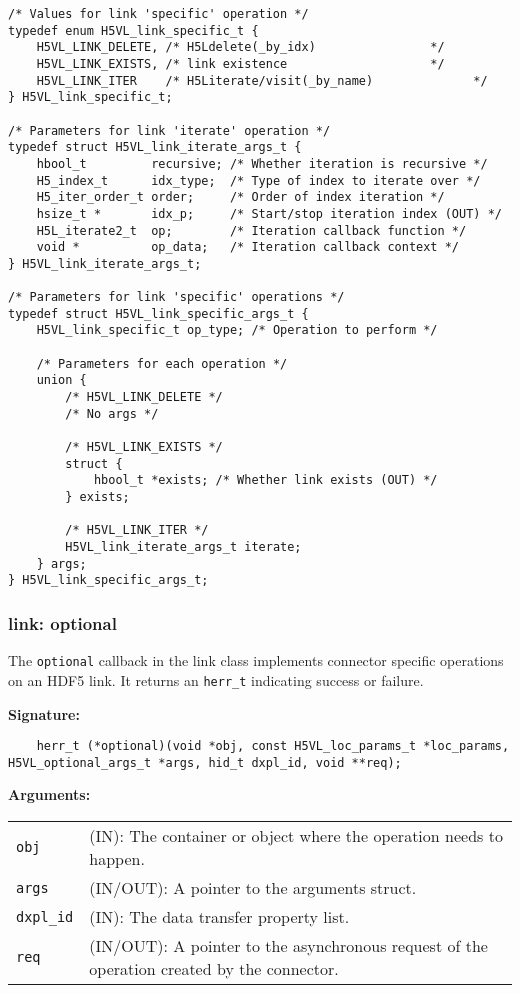 \begin{lstlisting}
/* Values for link 'specific' operation */
typedef enum H5VL_link_specific_t {
    H5VL_LINK_DELETE, /* H5Ldelete(_by_idx)                */
    H5VL_LINK_EXISTS, /* link existence                    */
    H5VL_LINK_ITER    /* H5Literate/visit(_by_name)              */
} H5VL_link_specific_t;

/* Parameters for link 'iterate' operation */
typedef struct H5VL_link_iterate_args_t {
    hbool_t         recursive; /* Whether iteration is recursive */
    H5_index_t      idx_type;  /* Type of index to iterate over */
    H5_iter_order_t order;     /* Order of index iteration */
    hsize_t *       idx_p;     /* Start/stop iteration index (OUT) */
    H5L_iterate2_t  op;        /* Iteration callback function */
    void *          op_data;   /* Iteration callback context */
} H5VL_link_iterate_args_t;

/* Parameters for link 'specific' operations */
typedef struct H5VL_link_specific_args_t {
    H5VL_link_specific_t op_type; /* Operation to perform */

    /* Parameters for each operation */
    union {
        /* H5VL_LINK_DELETE */
        /* No args */

        /* H5VL_LINK_EXISTS */
        struct {
            hbool_t *exists; /* Whether link exists (OUT) */
        } exists;

        /* H5VL_LINK_ITER */
        H5VL_link_iterate_args_t iterate;
    } args;
} H5VL_link_specific_args_t;

\end{lstlisting}

\subsubsection{link: optional}
The \texttt{optional} callback in the link class implements connector specific operations on an HDF5 link. It returns an \texttt{herr\_t} indicating success or failure.\bigskip 

\begin{mdframed}[style=bgbox]
\textbf{Signature:}
\begin{lstlisting}
    herr_t (*optional)(void *obj, const H5VL_loc_params_t *loc_params, H5VL_optional_args_t *args, hid_t dxpl_id, void **req);
\end{lstlisting}

\textbf{Arguments:}\\
\begin{tabular}{l p{13.5cm}}
  \texttt{obj} & (IN): The container or object where the operation needs to happen.\\
  \texttt{args} & (IN/OUT): A pointer to the arguments struct.\\
  \texttt{dxpl\_id} & (IN): The data transfer property list.\\
  \texttt{req} & (IN/OUT): A pointer to the asynchronous request of the operation created by the connector.\\
\end{tabular}
\end{mdframed}

